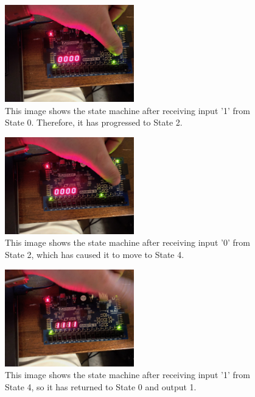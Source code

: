 \documentclass[11pt]{article}
\begin{document}
\begin{center}
\begin{figure}[H]
	\includegraphics[width=0.5\textwidth]{./images/Part3/IMG_0587.jpg}
	\caption{\label{fig:part3img5}This image shows the state machine after receiving input '1' from State 0. Therefore, it has progressed to State 2.}
\end{figure}
\end{center}

\begin{center}
\begin{figure}[H]
	\includegraphics[width=0.5\textwidth]{./images/Part3/IMG_0588.jpg}
	\caption{\label{fig:part3img6}This image shows the state machine after receiving input '0' from State 2, which has caused it to move to State 4.}
\end{figure}
\end{center}

\begin{center}
\begin{figure}[H]
	\includegraphics[width=0.5\textwidth]{./images/Part3/IMG_0589.jpg}
	\caption{\label{fig:part3img7}This image shows the state machine after receiving input '1' from State 4, so it has returned to State 0 and output 1.}
\end{figure}
\end{center}
\end{document}
